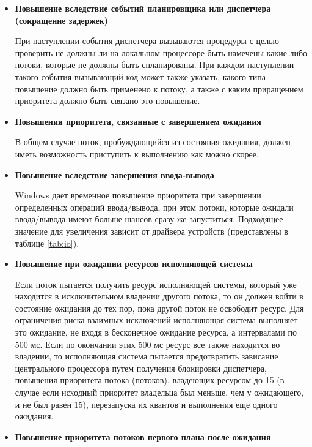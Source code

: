 \begin{itemize}
	\item \textbf{Повышение вследствие событий планировщика или диспетчера (сокращение задержек)}
	
	При наступлении события диспетчера вызываются процедуры с целью проверить не должны ли на локальном процессоре быть намечены какие-либо потоки, которые не должны быть спланированы. При каждом наступлении такого события вызывающий код может также указать, какого типа повышение должно быть применено к потоку, а также с каким приращением приоритета должно быть связано это повышение.
	
	\item \textbf{Повышения приоритета, связанные с завершением ожидания}
	
	В общем случае поток, пробуждающийся из состояния ожидания, должен иметь возможность приступить к выполнению как можно скорее.
	
	\item \textbf{Повышение вследствие завершения ввода-вывода }
	
	Windows дает временное повышение приоритета при завершении определенных операций ввода/вывода, при этом потоки, которые ожидали ввода/вывода имеют больше шансов сразу же запуститься. Подходящее значение для увеличения зависит от драйвера устройств (представлены в таблице \ref{tab:io}).
	
	\item \textbf{Повышение при ожидании ресурсов исполняющей системы}
	
	Если поток пытается получить ресурс исполняющей системы, который уже находится в исключительном владении другого потока, то он должен войти в состояние ожидания до тех пор, пока другой поток не освободит ресурс. Для ограничения риска взаимных исключений исполняющая система выполняет это ожидание, не входя в бесконечное ожидание ресурса, а интервалами по 500 мс. Если по окончании этих 500 мс ресурс все также находится во владении, то исполняющая система пытается предотвратить зависание центрального процессора путем получения блокировки диспетчера, повышения приоритета потока (потоков), владеющих ресурсом до 15 (в случае если исходный приоритет владельца был меньше, чем у ожидающего, и не был равен 15), перезапуска их квантов и выполнения еще одного ожидания.
	
	\item \textbf{Повышение приоритета потоков первого плана после ожидания}
	

\end{itemize}
